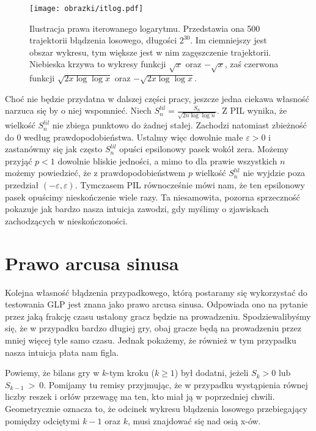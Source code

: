 \documentclass[a4paper,11pt,twoside]{book}
\newcommand{\Slil}[1]{S^{lil}_#1}
\theoremstyle{definition}
\begin{document}
\begin{figure}[!ht]
 \centering
 \texttt{[image: obrazki/itlog.pdf]}
 \caption{Ilustracja prawa iterowanego logarytmu. Przedstawia ona 500 trajektorii błądzenia losowego, długości $2^{30}$. Im ciemniejszy jest obszar wykresu, tym większe jest w nim zagęszczenie trajektorii. Niebieska krzywa to wykresy funkcji $\sqrt{x}$ oraz $-\sqrt{x}$, zaś czerwona funkcji $\sqrt{2 x \log \log x}$ oraz $-\sqrt{2 x \log \log x}$.}
 \label{fig:itlog}
\end{figure}

Choć nie będzie przydatna w dalszej części pracy, jeszcze jedna ciekawa własność narzuca się by o niej wspomnieć. Niech $\Slil{n} = \frac{S_n}{\sqrt{2n \log \log n}}$. Z PIL wynika, że wielkość $\Slil{n}$ nie zbiega punktowo do żadnej stałej. Zachodzi natomiast zbieżność do 0 według prawdopodobieństwa. Ustalmy więc dowolnie małe $\varepsilon > 0$ i zastanówmy się jak często $\Slil{n}$ opuści epsilonowy pasek wokół zera. Możemy przyjąć $p < 1$ dowolnie bliskie jedności, a mimo to dla prawie wszystkich $n$ możemy powiedzieć, że z prawdopodobieństwem $p$ wielkość $\Slil{n}$ nie wyjdzie poza przedział $(-\varepsilon, \varepsilon)$. Tymczasem PIL równocześnie mówi nam, że ten epsilonowy pasek opuścimy nieskończenie wiele razy. Ta niesamowita, pozorna sprzeczność pokazuje jak bardzo nasza intuicja zawodzi, gdy myślimy o zjawiskach zachodzących w nieskończoności.

\section{Prawo arcusa sinusa}
\label{par:asin}

Kolejna własność błądzenia przypadkowego, którą postaramy się wykorzystać do testowania GLP jest znana jako prawo arcusa sinusa. Odpowiada ono na pytanie przez jaką frakcję czasu ustalony gracz będzie na prowadzeniu. Spodziewalibyśmy się, że w przypadku bardzo długiej gry, obaj gracze będą na prowadzeniu przez mniej więcej tyle samo czasu. Jednak pokażemy, że również w tym przypadku nasza intuicja płata nam figla.

Powiemy, że bilans gry w $k$-tym kroku ($k \geq 1$) był dodatni, jeżeli $S_k > 0$ lub $S_{k-1}~>~0$. Pomijamy tu remisy przyjmując, że w przypadku wystąpienia równej liczby reszek i orłów przewagę ma ten, kto miał ją w poprzedniej chwili. Geometrycznie oznacza to, że odcinek wykresu błądzenia losowego przebiegający pomiędzy odciętymi $k-1$ oraz $k$, musi znajdować się nad osią x-ów.
\end{document}
